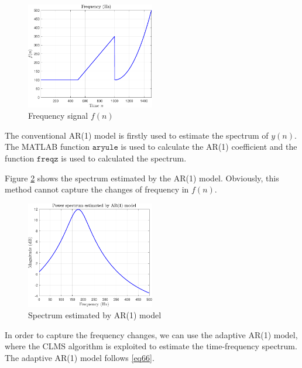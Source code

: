 \documentclass[10pt]{article}
\begin{document}
\begin{figure}[htbp]
    \centering
	\includegraphics[width=0.5\textwidth]{fig/3.2_1.pdf}

    \caption{Frequency signal $f(n)$}
    \label{fig22}
\end{figure}

The conventional AR(1) model is firstly used to estimate the spectrum of $y(n)$.
The MATLAB function $\mathtt{aryule}$ is used to calculate the AR(1) coefficient and
the function $\mathtt{freqz}$ is used to calculated the spectrum.

Figure \ref{fig23} shows the spectrum estimated by the AR(1) model. Obviously, 
this method cannot capture the changes of frequency in $f(n)$.

\begin{figure}[htbp]
    \centering
	\includegraphics[width=0.5\textwidth]{fig/3.2_2.pdf}

    \caption{Spectrum estimated by AR(1) model}
    \label{fig23}
\end{figure}

In order to capture the frequency changes, we can use the adaptive AR(1) model, where 
the CLMS algorithm is exploited to estimate the time-frequency spectrum. The adaptive AR(1)
model follows \eqref{eq66}.
\end{document}
